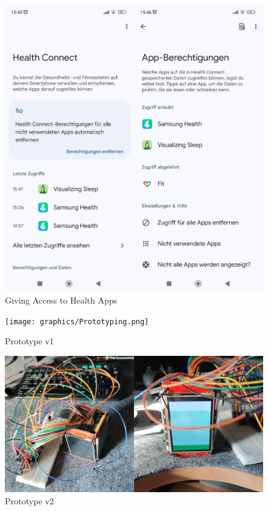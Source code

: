 \documentclass[
  a4paper,  %
  twoside,  %
  bibliography=totoc,
  headsepline,
  cleardoublepage=empty,
  parskip=half,
  draft=false
]{scrbook}
\begin{document}
\begin{figure}[H]
    \centering
    \includegraphics[scale=0.6]{graphics/HealthConnectStartRights.png}
    \caption{Giving Access to Health Apps}
    \label{fig:HealthApp-Access}
\end{figure}

\begin{figure}[H]
    \centering
    \texttt{[image: graphics/Prototyping.png]}
    \caption{Prototype v1}
    \label{fig:Prototype_v1}
\end{figure}

\begin{figure}[H]
    \centering
    \includegraphics[scale=0.7]{graphics/Prototype2.png}
    \caption{Prototype v2}
    \label{fig:Prototype_v2}
\end{figure}
\end{document}
